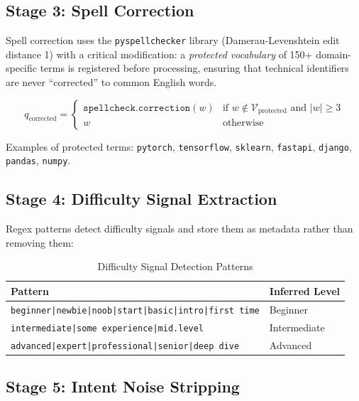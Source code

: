 \documentclass[12pt, a4paper]{article}
\begin{document}
\subsection{Stage 3: Spell Correction}

Spell correction uses the \texttt{pyspellchecker} library (Damerau-Levenshtein edit distance 1)
with a critical modification: a \textit{protected vocabulary} of 150+ domain-specific terms is
registered before processing, ensuring that technical identifiers are never ``corrected'' to
common English words.

\begin{equation}
    q_{\text{corrected}} = \begin{cases}
        \texttt{spellcheck.correction}(w) & \text{if } w \notin \mathcal{V}_{\text{protected}} \text{ and } |w| \geq 3 \\
        w & \text{otherwise}
    \end{cases}
    \label{eq:spellcheck}
\end{equation}

Examples of protected terms: \texttt{pytorch}, \texttt{tensorflow}, \texttt{sklearn},
\texttt{fastapi}, \texttt{django}, \texttt{pandas}, \texttt{numpy}.

\subsection{Stage 4: Difficulty Signal Extraction}

Regex patterns detect difficulty signals and store them as metadata rather than removing them:

\begin{table}[htbp]
\centering
\caption{Difficulty Signal Detection Patterns}
\label{tab:difficulty}
\renewcommand{\arraystretch}{1.2}
\begin{tabular}{ll}
\toprule
\textbf{Pattern} & \textbf{Inferred Level} \\
\midrule
\texttt{beginner|newbie|noob|start|basic|intro|first time} & Beginner \\
\texttt{intermediate|some experience|mid.level} & Intermediate \\
\texttt{advanced|expert|professional|senior|deep dive} & Advanced \\
\bottomrule
\end{tabular}
\end{table}

\subsection{Stage 5: Intent Noise Stripping}
\end{document}

